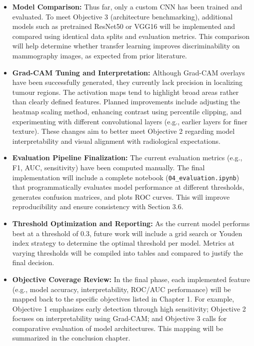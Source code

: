 \documentclass[12pt]{article}
\begin{document}
\begin{itemize}
    \item \textbf{Model Comparison:} Thus far, only a custom CNN has been trained and evaluated. To meet Objective 3 (architecture benchmarking), additional models such as pretrained ResNet50 or VGG16 will be implemented and compared using identical data splits and evaluation metrics. This comparison will help determine whether transfer learning improves discriminability on mammography images, as expected from prior literature.

    \item \textbf{Grad-CAM Tuning and Interpretation:} Although Grad-CAM overlays have been successfully generated, they currently lack precision in localizing tumour regions. The activation maps tend to highlight broad areas rather than clearly defined features. Planned improvements include adjusting the heatmap scaling method, enhancing contrast using percentile clipping, and experimenting with different convolutional layers (e.g., earlier layers for finer texture). These changes aim to better meet Objective 2 regarding model interpretability and visual alignment with radiological expectations.

    \item \textbf{Evaluation Pipeline Finalization:} The current evaluation metrics (e.g., F1, AUC, sensitivity) have been computed manually. The final implementation will include a complete notebook (\texttt{04\_evaluation.ipynb}) that programmatically evaluates model performance at different thresholds, generates confusion matrices, and plots ROC curves. This will improve reproducibility and ensure consistency with Section 3.6.

    \item \textbf{Threshold Optimization and Reporting:} As the current model performs best at a threshold of 0.3, future work will include a grid search or Youden index strategy to determine the optimal threshold per model. Metrics at varying thresholds will be compiled into tables and compared to justify the final decision.

    \item \textbf{Objective Coverage Review:} In the final phase, each implemented feature (e.g., model accuracy, interpretability, ROC/AUC performance) will be mapped back to the specific objectives listed in Chapter 1. For example, Objective 1 emphasizes early detection through high sensitivity; Objective 2 focuses on interpretability using Grad-CAM; and Objective 3 calls for comparative evaluation of model architectures. This mapping will be summarized in the conclusion chapter.
\end{itemize}
\end{document}
